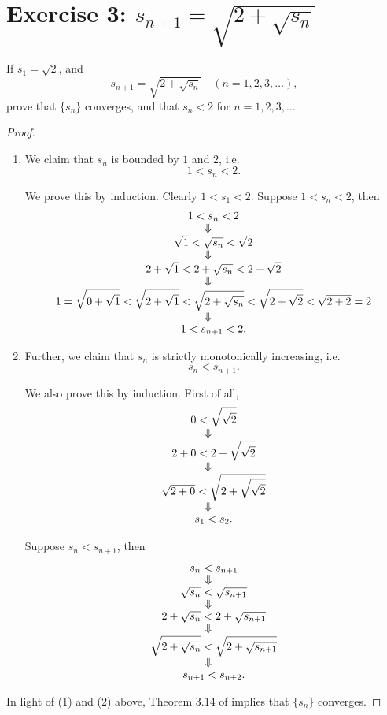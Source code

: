\documentclass{amsbook}
\theoremstyle{definition}
\theoremstyle{remark}
\numberwithin{section}{chapter}
\numberwithin{equation}{chapter}
\begin{document}
\section{Exercise 3: $s_{n+1}=\sqrt{2+\sqrt{s_n}}$}\label{Exercise 3.3}
If $s_1=\sqrt{2}$, and\[
s_{n+1}=\sqrt{2+\sqrt{s_n}}\quad(n=1,2,3,\dots),
\]prove that $\{s_n\}$ converges, and that $s_n<2$ for $n=1,2,3,\dots$.
\begin{proof}
\begin{enumerate}
\item We claim that $s_n$ is bounded by $1$ and $2$, i.e.\[
1<s_n<2.
\]

We prove this by induction. Clearly $1<s_1<2$. Suppose $1<s_n<2$, then
\begin{gather*}
1<s_n<2\\
\ArrowBetweenLines[\Downarrow]
\sqrt{1}<\sqrt{s_n}<\sqrt{2}\\
\ArrowBetweenLines[\Downarrow]
2+\sqrt{1}<2+\sqrt{s_n}<2+\sqrt{2}\\
\ArrowBetweenLines[\Downarrow]
1=\sqrt{0+\sqrt{1}}<\sqrt{2+\sqrt{1}}<\sqrt{2+\sqrt{s_n}}<\sqrt{2+\sqrt{2}}<\sqrt{2+2}=2\\
\ArrowBetweenLines[\Downarrow]
1<s_{n+1}<2.
\end{gather*}

\item Further, we claim that $s_n$ is strictly monotonically increasing, i.e.\[
s_n<s_{n+1}.
\]

We also prove this by induction. First of all,
\begin{gather*}
0<\sqrt{\sqrt{2}}\\
\ArrowBetweenLines[\Downarrow]
2+0<2+\sqrt{\sqrt{2}}\\
\ArrowBetweenLines[\Downarrow]
\sqrt{2+0}<\sqrt{2+\sqrt{\sqrt{2}}}\\
\ArrowBetweenLines[\Downarrow]
s_1<s_2.
\end{gather*}

Suppose $s_n<s_{n+1}$, then
\begin{gather*}
s_n<s_{n+1}\\
\ArrowBetweenLines[\Downarrow]
\sqrt{s_n}<\sqrt{s_{n+1}}\\
\ArrowBetweenLines[\Downarrow]
2+\sqrt{s_n}<2+\sqrt{s_{n+1}}\\
\ArrowBetweenLines[\Downarrow]
\sqrt{2+\sqrt{s_n}}<\sqrt{2+\sqrt{s_{n+1}}}\\
\ArrowBetweenLines[\Downarrow]
s_{n+1}<s_{n+2}.
\end{gather*}
\end{enumerate}

In light of (1) and (2) above, Theorem 3.14 of \cite{rudin1976principles} implies that $\{s_n\}$ converges.
\end{proof}
\end{document}
